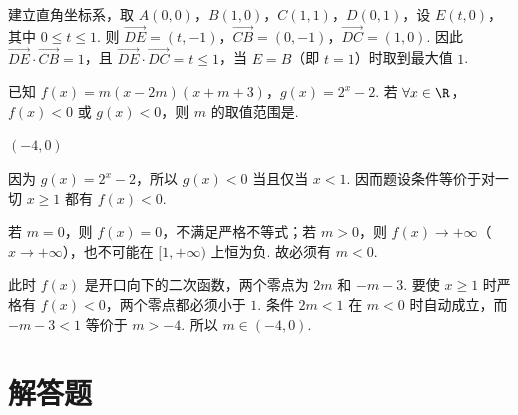 \begin{solution}
建立直角坐标系，取 \(A(0,0)\)，\(B(1,0)\)，\(C(1,1)\)，\(D(0,1)\)，设 \(E(t,0)\)，其中 \(0\leqslant t\leqslant1\). 则
\(\overrightarrow{DE}=(t,-1)\)，\(\overrightarrow{CB}=(0,-1)\)，\(\overrightarrow{DC}=(1,0)\).
因此 \(\overrightarrow{DE}\cdot\overrightarrow{CB}=1\)，且 \(\overrightarrow{DE}\cdot\overrightarrow{DC}=t\leqslant1\)，当 \(E=B\)（即 \(t=1\)）时取到最大值 \(1\).
\end{solution}

\begin{problem}
已知 \(f(x) = m(x - 2m)(x + m + 3)\)，\(g(x) = 2^{x} - 2\). 若 \(\forall x \in \R\)，\(f(x) < 0\) 或 \(g(x) < 0\)，则 \(m\) 的取值范围是\fillinblank{}.
\end{problem}

\begin{answer}
\((-4,0)\)
\end{answer}

\begin{solution}
因为 \(g(x)=2^x-2\)，所以 \(g(x)<0\) 当且仅当 \(x<1\). 因而题设条件等价于对一切 \(x\geqslant1\) 都有 \(f(x)<0\).

若 \(m=0\)，则 \(f(x)=0\)，不满足严格不等式；若 \(m>0\)，则 \(f(x)\to+\infty\)（\(x\to+\infty\)），也不可能在 \([1,+\infty)\) 上恒为负. 故必须有 \(m<0\).

此时 \(f(x)\) 是开口向下的二次函数，两个零点为 \(2m\) 和 \(-m-3\). 要使 \(x\geqslant1\) 时严格有 \(f(x)<0\)，两个零点都必须小于 \(1\). 条件 \(2m<1\) 在 \(m<0\) 时自动成立，而 \(-m-3<1\) 等价于 \(m>-4\). 所以 \(m\in(-4,0)\).
\end{solution}

\section{解答题}

